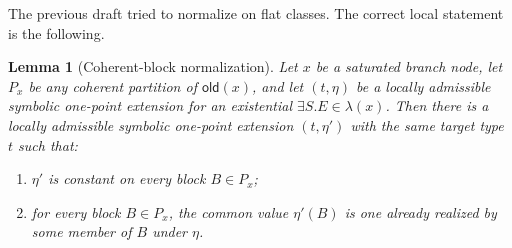 \documentclass[11pt]{article}
\newtheorem{lemma}[theorem]{Lemma}
\theoremstyle{definition}
\newcommand{\older}{\mathsf{old}}
\begin{document}
The previous draft tried to normalize on flat classes. The correct local statement is the following.

\begin{lemma}[Coherent-block normalization]\label{lem:coherent-normalization}
Let $x$ be a saturated branch node, let $P_x$ be any coherent partition of $\older(x)$, and let $(t,\eta)$ be a locally admissible symbolic one-point extension for an existential $\exists S.E\in\lambda(x)$. Then there is a locally admissible symbolic one-point extension $(t,\eta')$ with the same target type $t$ such that:
\begin{enumerate}[label=(\alph*)]
  \item $\eta'$ is constant on every block $B\in P_x$;
  \item for every block $B\in P_x$, the common value $\eta'(B)$ is one already realized by some member of $B$ under $\eta$.
\end{enumerate}
\end{lemma}
\end{document}
